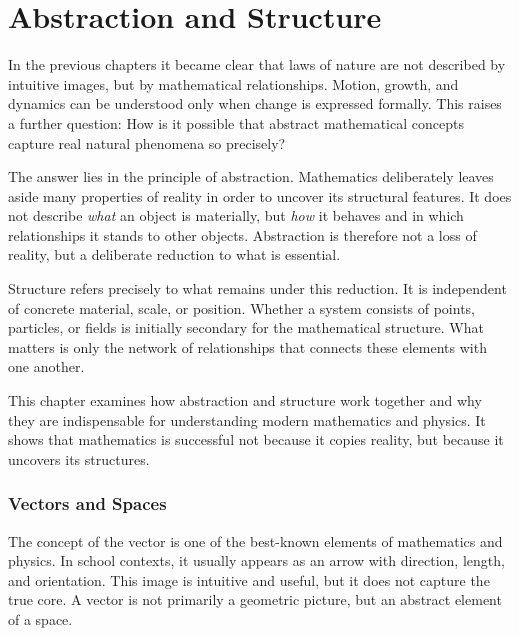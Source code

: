 \chapter{Abstraction and Structure}
\label{chap:V_abstraction}

In the previous chapters it became clear
that laws of nature
are not described by intuitive images,
but by mathematical relationships.
Motion,
growth,
and dynamics
can be understood only
when change
is expressed formally.
This raises a further question:
How is it possible
that abstract mathematical concepts
capture real natural phenomena so precisely?

The answer lies in the principle of abstraction.
Mathematics
deliberately leaves aside many properties of reality
in order to uncover its structural features.
It does not describe
\emph{what} an object is materially,
but \emph{how} it behaves
and in which relationships it stands to other objects.
Abstraction is therefore not a loss of reality,
but a deliberate reduction to what is essential.

Structure
refers precisely to what remains under this reduction.
It is independent of concrete material,
scale,
or position.
Whether a system consists of points,
particles,
or fields
is initially secondary for the mathematical structure.
What matters is only the network of relationships
that connects these elements with one another.

This chapter examines
how abstraction and structure work together
and why they are indispensable
for understanding modern mathematics
and physics.
It shows
that mathematics is successful not because it copies reality,
but because it uncovers its structures.

\subsection{Vectors and Spaces}

The concept of the vector
is one of the best-known elements of mathematics
and physics.
In school contexts, it usually appears as an arrow
with direction, length, and orientation.
This image is intuitive and useful,
but it does not capture the true core.
A vector is not primarily a geometric picture,
but an abstract element of a space.

